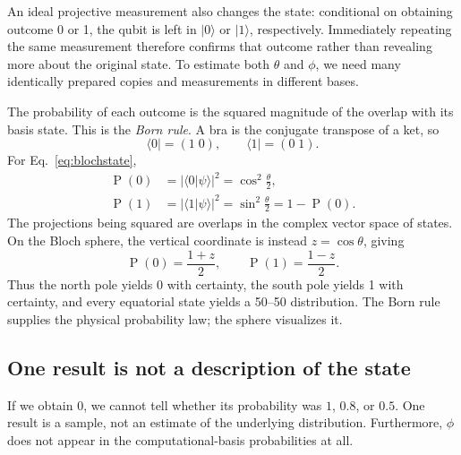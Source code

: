 \documentclass[11pt,a4paper]{article}
\newcommand{\ket}[1]{\lvert #1\rangle}
\newcommand{\bra}[1]{\langle #1\rvert}
\newcommand{\Prob}{\mathop{\mathrm{P}}}
\begin{document}

An ideal projective measurement also changes the state: conditional on obtaining outcome 0 or 1, the qubit is left in \(\ket{0}\) or \(\ket{1}\), respectively. Immediately repeating the same measurement therefore confirms that outcome rather than revealing more about the original state. To estimate both \(\theta\) and \(\phi\), we need many identically prepared copies and measurements in different bases.

The probability of each outcome is the squared magnitude of the overlap with its basis state. This is the \emph{Born rule}. A bra is the conjugate transpose of a ket, so
\[
\bra{0}=(1\;0),\qquad \bra{1}=(0\;1).
\]
For Eq.~\eqref{eq:blochstate},
\begin{align}
\Prob(0)&=|\bra{0}\psi\rangle|^2=\cos^2\frac\theta2,\\
\Prob(1)&=|\bra{1}\psi\rangle|^2=\sin^2\frac\theta2=1-\Prob(0).
\end{align}
The projections being squared are overlaps in the complex vector space of states. On the Bloch sphere, the vertical coordinate is instead $z=\cos\theta$, giving
\begin{equation}\label{eq:height}
\boxed{\Prob(0)=\frac{1+z}{2},\qquad\Prob(1)=\frac{1-z}{2}.}
\end{equation}
Thus the north pole yields 0 with certainty, the south pole yields 1 with certainty, and every equatorial state yields a 50--50 distribution. The Born rule supplies the physical probability law; the sphere visualizes it.

\newpage
\subsection{One result is not a description of the state}
If we obtain 0, we cannot tell whether its probability was $1$, $0.8$, or $0.5$. One result is a sample, not an estimate of the underlying distribution. Furthermore, $\phi$ does not appear in the computational-basis probabilities at all.
\end{document}
